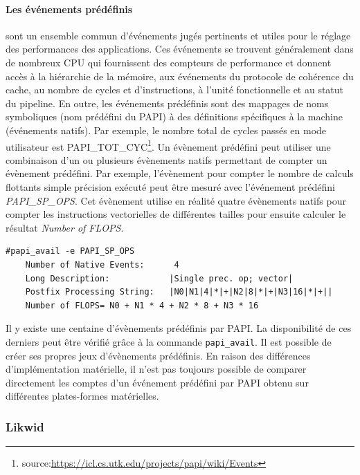             \paragraph{Les événements \textbf{prédéfinis}} sont un ensemble commun d'événements jugés pertinents et utiles pour le réglage des performances des applications. Ces événements se trouvent généralement dans de nombreux CPU qui fournissent des compteurs de performance et donnent accès à la hiérarchie de la mémoire, aux événements du protocole de cohérence du cache, au nombre de cycles et d'instructions, à l'unité fonctionnelle et au statut du pipeline. En outre, les événements prédéfinis sont des mappages de noms symboliques (nom prédéfini du PAPI) à des définitions spécifiques à la machine (événements natifs). Par exemple, le nombre total de cycles passés en mode utilisateur est PAPI\_TOT\_CYC\footnote{source:\url{https://icl.cs.utk.edu/projects/papi/wiki/Events}}. Un évènement prédéfini peut utiliser une combinaison d'un ou plusieurs évènements natifs permettant de compter un évènement prédéfini. Par exemple, l'évènement pour compter le nombre de calculs flottants simple précision exécuté peut être mesuré avec l'événement prédéfini \textit{PAPI\_SP\_OPS}. Cet évènement utilise en réalité quatre évènements natifs pour compter les instructions vectorielles de différentes tailles pour ensuite calculer le résultat \textit{Number of FLOPS}.

\begin{verbatim}
#papi_avail -e PAPI_SP_OPS
    Number of Native Events:      4
    Long Description:            |Single prec. op; vector|
    Postfix Processing String:   |N0|N1|4|*|+|N2|8|*|+|N3|16|*|+||
    Number of FLOPS= N0 + N1 * 4 + N2 * 8 + N3 * 16
\end{verbatim}

            Il y existe une centaine d'évènements prédéfinis par PAPI. La disponibilité de ces derniers peut être vérifié grâce à la commande \verb|papi_avail|. Il est possible de créer ses propres jeux d'évènements prédéfinis. En raison des différences d'implémentation matérielle, il n'est pas toujours possible de comparer directement les comptes d'un événement prédéfini par PAPI obtenu sur différentes plates-formes matérielles.

    
        \subsubsection{Likwid}
        

